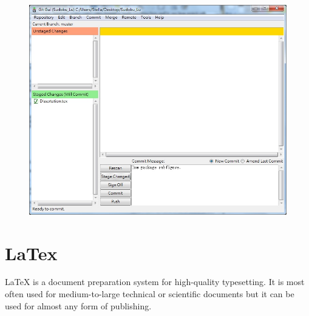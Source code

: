 \documentclass[11pt]{report}
\begin{document}
\begin{figure}[h]
\begin{center}
{\includegraphics[scale=0.28]{GitStage.jpg}
\label{fig:gitstage}}
\end{center}
\end{figure}



\section{LaTex}
\label{sec:latex}
LaTeX is a document preparation system for high-quality typesetting. It is most often used for medium-to-large technical or scientific documents but it can be used for almost any form of publishing.
\end{document}
